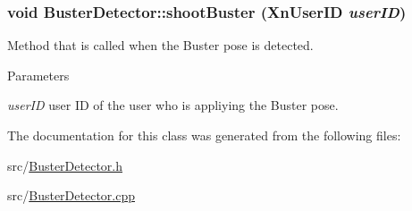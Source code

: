 \hypertarget{classBusterDetector_a220cb00cf59b19e778771c4638c7e572}{
\subsubsection[{shootBuster}]{\setlength{\rightskip}{0pt plus 5cm}void BusterDetector::shootBuster (XnUserID {\em userID})}}
\label{classBusterDetector_a220cb00cf59b19e778771c4638c7e572}
Method that is called when the Buster pose is detected. 
\begin{DoxyParams}{Parameters}
\item[{\em userID}]user ID of the user who is appliying the Buster pose. \end{DoxyParams}


The documentation for this class was generated from the following files:\begin{DoxyCompactItemize}
\item 
src/\hyperlink{BusterDetector_8h}{BusterDetector.h}\item 
src/\hyperlink{BusterDetector_8cpp}{BusterDetector.cpp}\end{DoxyCompactItemize}
